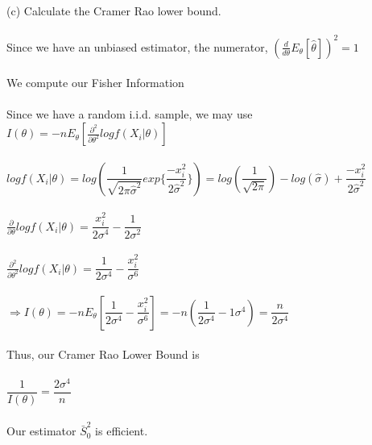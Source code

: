 \documentclass{article}
\begin{document}
(c) Calculate the Cramer Rao lower bound.\\\\
Since we have an unbiased estimator, the numerator, $(\frac{d}{d\theta}E_\theta[\hat{\theta}])^2=1$\\\\
We compute our Fisher Information\\\\
Since we have a random i.i.d. sample, we may use $I(\theta)=-nE_\theta[\frac{\partial^2}{\partial \theta^2}logf(X_i|\theta)]$\\\\
$logf(X_i|\theta)=log(\dfrac{1}{\sqrt{2\pi\hat{\sigma}^2}}exp\{\dfrac{-x_i^2}{2\hat{\sigma}^2}\})=log(\dfrac{1}{\sqrt{2\pi}})-log(\hat{\sigma})+\dfrac{-x_i^2}{2\hat{\sigma}^2}$\\\\
$\frac{\partial}{\partial \theta}logf(X_i|\theta)=\dfrac{x_i^2}{2\sigma^4}-\dfrac{1}{2\sigma^2}$\\\\
$\frac{\partial^2}{\partial \theta^2}logf(X_i|\theta)=\dfrac{1}{2\sigma^4}-\dfrac{x_i^2}{\sigma^6}$\\\\
$\Rightarrow I(\theta)=-nE_\theta[\dfrac{1}{2\sigma^4}-\dfrac{x_i^2}{\sigma^6}]=-n(\dfrac{1}{2\sigma^4}-{1}{\sigma^4})=\dfrac{n}{2\sigma^4}$\\\\
Thus, our Cramer Rao Lower Bound is\\\\
$\dfrac{1}{I(\theta)}=\dfrac{2\sigma^4}{n}$\\\\
Our estimator $\bar{S}_0^2$ is efficient.
\pagebreak
\end{document}
